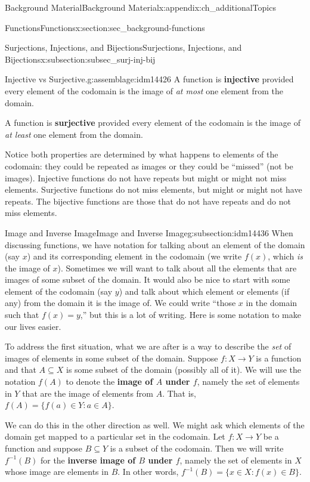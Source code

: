 \documentclass[oneside,10pt,]{book}
\newcommand{\terminology}[1]{\textbf{#1}}
\numberwithin{equation}{chapter}
\def\inv{^{-1}}
\def\st{:}
\begin{document}
\begin{appendixptx}{Background Material}{}{Background Material}{}{}{x:appendix:ch_additionalTopics}
\begin{sectionptx}{Functions}{}{Functions}{}{}{x:section:sec_background-functions}
\begin{subsectionptx}{Surjections, Injections, and Bijections}{}{Surjections, Injections, and Bijections}{}{}{x:subsection:subsec_surj-inj-bij}
\begin{assemblage}{Injective vs Surjective.}{g:assemblage:idm14426}
A function is \terminology{injective} provided every element of the codomain is the image of \emph{at most} one element from the domain.%
\par
A function is \terminology{surjective} provided every element of the codomain is the image of \emph{at least} one element from the domain.%
\end{assemblage}
Notice both properties are determined by what happens to elements of the codomain: they could be repeated as images or they could be ``missed'' (not be images).  Injective functions do not have repeats but might or might not miss elements.  Surjective functions do not miss elements, but might or might not have repeats.  The bijective functions are those that do not have repeats and do not miss elements.%
\end{subsectionptx}
%
%
\typeout{************************************************}
\typeout{************************************************}
%
\begin{subsectionptx}{Image and Inverse Image}{}{Image and Inverse Image}{}{}{g:subsection:idm14436}
When discussing functions, we have notation for talking about an element of the domain (say \(x\)) and its corresponding element in the codomain (we write \(f(x)\), which \emph{is} the image of \(x\)). Sometimes we will want to talk about all the elements that are images of some subset of the domain.  It would also be nice to start with some element of the codomain (say \(y\)) and talk about which element or elements (if any) from the domain it is the image of. We could write ``those \(x\) in the domain such that \(f(x) = y\),'' but this is a lot of writing. Here is some notation to make our lives easier.%
\par
To address the first situation, what we are after is a way to describe the \emph{set} of images of elements in some subset of the domain.  Suppose \(f:X \to Y\) is a function and that \(A \subseteq X\) is some subset of the domain (possibly all of it).  We will use the notation \(f(A)\) to denote the \terminology{image of \(A\) under \(f\)}, namely the set of elements in \(Y\) that are the image of elements from \(A\).  That is, \(f(A) = \{f(a) \in Y \st a \in A\}\). \label{g:notation:idm14458}%
\par
We can do this in the other direction as well.  We might ask which elements of the domain get mapped to a particular set in the codomain.  Let \(f:X \to Y\) be a function and suppose \(B \subseteq Y\) is a subset of the codomain.  Then we will write \(f\inv(B)\) for the \terminology{inverse image of \(B\) under \(f\)}, namely the set of elements in \(X\) whose image are elements in \(B\).  In other words, \(f\inv(B) = \{x \in X \st f(x) \in B\}\). \label{g:notation:idm14473}%

\end{subsectionptx}
\end{sectionptx}
\end{appendixptx}
\end{document}
